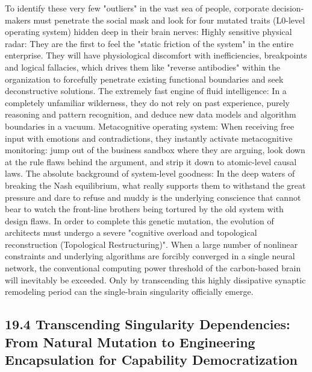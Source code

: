 \documentclass[11pt,a4paper]{article}
\begin{document}
To identify these very few "outliers" in the vast sea of people, corporate decision-makers must penetrate the social mask and look for four mutated traits (L0-level operating system) hidden deep in their brain nerves: Highly sensitive physical radar: They are the first to feel the "static friction of the system" in the entire enterprise. They will have physiological discomfort with inefficiencies, breakpoints and logical fallacies, which drives them like "reverse antibodies" within the organization to forcefully penetrate existing functional boundaries and seek deconstructive solutions. The extremely fast engine of fluid intelligence: In a completely unfamiliar wilderness, they do not rely on past experience, purely reasoning and pattern recognition, and deduce new data models and algorithm boundaries in a vacuum. Metacognitive operating system: When receiving free input with emotions and contradictions, they instantly activate metacognitive monitoring: jump out of the business sandbox where they are arguing, look down at the rule flaws behind the argument, and strip it down to atomic-level causal laws. The absolute background of system-level goodness: In the deep waters of breaking the Nash equilibrium, what really supports them to withstand the great pressure and dare to refuse and muddy is the underlying conscience that cannot bear to watch the front-line brothers being tortured by the old system with design flaws. In order to complete this genetic mutation, the evolution of architects must undergo a severe "cognitive overload and topological reconstruction (Topological Restructuring)". When a large number of nonlinear constraints and underlying algorithms are forcibly converged in a single neural network, the conventional computing power threshold of the carbon-based brain will inevitably be exceeded. Only by transcending this highly dissipative synaptic remodeling period can the single-brain singularity officially emerge.


\subsection*{19.4 Transcending Singularity Dependencies: From Natural Mutation to Engineering Encapsulation for Capability Democratization}
\end{document}
